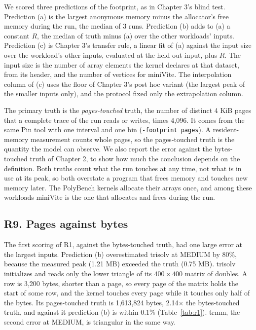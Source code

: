 \documentclass[11pt]{article}
\begin{document}
We scored three predictions of the footprint, as in Chapter 3's blind test. Prediction (a) is the largest
anonymous memory minus the allocator's free memory during the run, the median of 3 runs. Prediction (b) adds to
(a) a constant $R$, the median of truth minus (a) over the other workloads' inputs. Prediction (c) is Chapter 3's
transfer rule, a linear fit of (a) against the input size over the workload's other inputs, evaluated at the
held-out input, plus $R$. The input size is the number of array elements the kernel declares at that dataset, from
its header, and the number of vertices for miniVite. The interpolation column of (c) uses the floor of Chapter 3's
post hoc variant (the largest peak of the smaller inputs only), and the protocol fixed only the extrapolation
column.

The primary truth is the \emph{pages-touched} truth, the number of distinct 4 KiB pages that a complete trace of the
run reads or writes, times 4,096. It comes from the same Pin tool with one interval and one bin
(\texttt{-footprint pages}). A resident-memory measurement counts whole pages, so the pages-touched truth is the
quantity the model can observe. We also report the error against the bytes-touched truth of Chapter 2, to show how
much the conclusion depends on the definition. Both truths count what the run touches at any time, not what is in
use at its peak, so both overstate a program that frees memory and touches new memory later. The PolyBench
kernels allocate their arrays once, and among these workloads miniVite is the one that allocates and frees during
the run.

\subsection{R9. Pages against bytes}
\label{sec:r9}

The first scoring of R1, against the bytes-touched truth, had one large error at the largest inputs. Prediction
(b) overestimated trisolv at MEDIUM by 80\%, because the measured peak (1.21 MB) exceeded the truth (0.75 MB).
trisolv initializes and reads only the lower triangle of its $400 \times 400$ matrix of doubles. A row is
3,200 bytes, shorter than a page, so every page of the matrix holds the start of some row, and the kernel touches
every page while it touches only half of the bytes. Its pages-touched truth is 1,613,824 bytes, 2.14$\times$ the
bytes-touched truth, and against it prediction (b) is within 0.1\% (Table~\ref{tab:r1}). trmm, the second error
at MEDIUM, is triangular in the same way.
\end{document}

